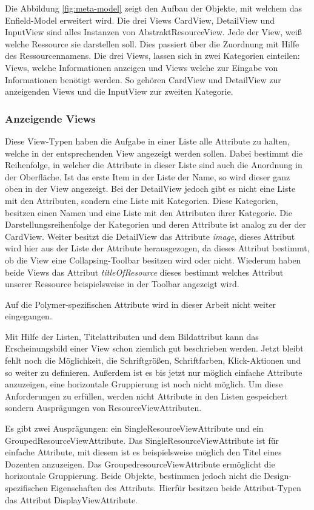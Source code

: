 Die Abbildung \ref{fig:meta-model} zeigt den Aufbau der Objekte, mit welchem das Enfield-Model erweitert wird. Die drei Views CardView, DetailView und InputView sind alles Instanzen von AbstraktResourceView. Jede der View, weiß welche Ressource sie darstellen soll. Dies passiert über die Zuordnung mit Hilfe des Ressourcennamens. Die drei Views, lassen sich in zwei Kategorien einteilen: Views, welche Informationen anzeigen und Views welche zur Eingabe von Informationen benötigt werden.
So gehören CardView und DetailView zur anzeigenden Views und die InputView zur zweiten Kategorie. 

\subsubsection{Anzeigende Views}
Diese View-Typen haben die Aufgabe in einer Liste alle Attribute zu halten, welche in der entsprechenden View angezeigt werden sollen. Dabei bestimmt die Reihenfolge, in welcher die Attribute in dieser Liste sind auch die Anordnung in der Oberfläche. Ist das erste Item in der Liste der Name, so wird dieser ganz oben in der View angezeigt.
Bei der DetailView jedoch gibt es nicht eine Liste mit den Attributen, sondern eine Liste mit Kategorien. Diese Kategorien, besitzen 
einen Namen und eine Liste mit den Attributen ihrer Kategorie. Die Darstellungsreihenfolge der Kategorien und deren Attribute ist analog zu der der CardView. Weiter besitzt die DetailView das Attribute \textit{image}, dieses Attribut wird hier aus der Liste der Attribute herausgezogen, da dieses Attribut bestimmt, ob die View eine Collapsing-Toolbar besitzen wird oder nicht. Wiederum haben beide Views das Attribut \textit{titleOfResource} dieses bestimmt welches Attribut unserer Ressource beispielsweise in der Toolbar angezeigt wird.

Auf die Polymer-spezifischen Attribute wird in dieser Arbeit nicht weiter eingegangen.

Mit Hilfe der Listen, Titelattributen und dem Bildattribut kann das Erscheinungsbild einer View schon ziemlich gut beschrieben werden. Jetzt bleibt fehlt noch die Möglichkeit, die Schriftgrößen, Schriftfarben, Klick-Aktionen und so weiter zu definieren.
Außerdem ist es bis jetzt nur möglich einfache Attribute anzuzeigen, eine horizontale Gruppierung ist noch nicht möglich. Um diese Anforderungen zu erfüllen, werden nicht Attribute in den Listen gespeichert sondern Ausprägungen von ResourceViewAttributen. 

Es gibt zwei Ausprägungen: ein SingleResourceViewAttribute und ein GroupedResourceViewAttribute.  Das SingleResourceViewAttribute ist für einfache Attribute, mit diesem ist es beispielsweise möglich den Titel eines Dozenten anzuzeigen. Das GroupedresourceViewAttribute ermöglicht die horizontale Gruppierung. Beide Objekte, bestimmen jedoch nicht die Design-spezifischen Eigenschaften des Attributs. Hierfür besitzen beide Attribut-Typen das Attribut DisplayViewAttribute.

